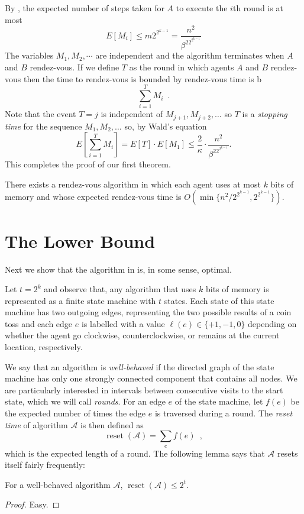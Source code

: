 \documentclass[lotsofwhite]{patmorin}
\newcommand{\A}{\mathcal{A}}
\DeclareMathOperator{\reset}{reset}
\begin{document}
By , the expected number of steps taken for $A$ to
execute the $i$th round is at most
\[
    E[M_i] \le m 2^{2^{k-1}} = \frac{n^2}{\beta^22^{2^{k-1}}}
\]
The variables $M_1,M_2,\cdots$ are independent and the algorithm
terminates when $A$ and $B$ rendez-vous.  If we define $T$ as
the round in which agents $A$ and $B$ rendez-vous then the time to
rendez-vous is bounded by
rendez-vous time is b
\[
   \sum_{i=1}^T M_i \enspace .
\]
Note that the event $T=j$ is independent of $M_{j+1},M_{j+2},\ldots$
so $T$ is a \emph{stopping time} \cite{mXX} for the sequence
$M_1,M_2,\ldots$ so, by Wald's equation
\[
   E\left[\sum_{i=1}^T M_i\right] = E[T]\cdot E[M_1] \le
\frac{2}{\kappa}\cdot \frac{n^2}{\beta^22^{2^{k-1}}}.
\]
This completes the proof of our first theorem.
\begin{thm}
There exists a rendez-vous algorithm in which each agent uses at most
$k$ bits of memory and whose expected rendez-vous time is
$O(\min\{n^2/2^{2^{k-1}},2^{2^{k-1}}\})$.
\end{thm}

\section{The Lower Bound}

Next we show that the algorithm in  is, in some
sense, optimal.

Let $t=2^k$ and observe that, any algorithm that uses $k$ bits of
memory is represented as a finite state machine with $t$ states.  Each
state of this state machine has two outgoing edges, representing the
two possible results of a coin toss and each edge $e$ is labelled with
a value $\ell(e)\in\{+1,-1, 0\}$ depending on whether the agent go
clockwise, counterclockwise, or remains at the current location,
respectively.

We say that an algorithm is \emph{well-behaved} if the directed graph
of the state machine has only one strongly connected component that
contains all nodes.  We are particularly interested in intervals
between consecutive visits to the start state, which we will call
\emph{rounds}.  For an edge $e$ of the
state machine, let $f(e)$ be the expected number of times the edge $e$
is traversed during a round.  The
\emph{reset time} of algorithm $\A$ is then defined as
\[
   \reset(\A) = \sum_e f(e) \enspace ,
\]
which is the expected length of a round.  The following lemma says
that $\mathcal{A}$ resets itself fairly frequently:
\begin{lem}
For a well-behaved algorithm $\A$, $\reset(\A)\le 2^t$.
\end{lem}
\begin{proof}
Easy.
\end{proof}
\end{document}
